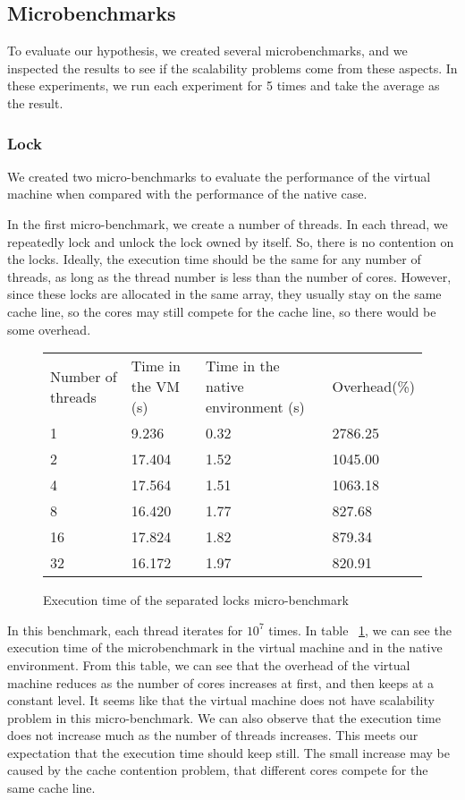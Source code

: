 \subsection{Microbenchmarks}
\label{sec:mic}
To evaluate our hypothesis, we created several microbenchmarks, and we inspected
the results to see if the scalability problems come from these aspects.
In these experiments, we run each experiment for 5 times and take the average
as the result.

\subsubsection{Lock}
We created two micro-benchmarks to evaluate the performance of the virtual
machine when compared with the performance of the native case.

In the first micro-benchmark, we create a number of threads. In each thread, 
we repeatedly lock and unlock the lock owned by itself. So, there is no 
contention on the locks. Ideally, the execution time should be the same for any 
number of threads, as long as the thread number is less than the number of 
cores.  However, since these locks are allocated in the same array, they usually
stay on the same cache line, so the cores may still compete for the cache line,
so there would be some overhead.

\begin{figure}[here]
\begin{tabular}{  l | l | l | l  }
	Number of threads & Time in the VM (s) & Time in the native environment (s) & Overhead(\%) \\
	1 & 9.236 & 0.32 & 2786.25 \\ 
	2 & 17.404 & 1.52 & 1045.00 \\
	4 & 17.564 & 1.51 & 1063.18 \\
	8 & 16.420 & 1.77 & 827.68 \\
	16 & 17.824 & 1.82 & 879.34 \\
	32 & 16.172 & 1.97 & 820.91 \\
\end{tabular}
\caption{Execution time of the separated locks micro-benchmark}
\label{fig:sep_mutex}
\end{figure}

In this benchmark, each thread iterates for $10^7$ times.
In table ~\ref{fig:sep_mutex}, we can see the execution time of the
microbenchmark in the virtual machine and in the native environment.
From this table, we can see that the overhead of the virtual machine reduces as
the number of cores increases at first, and then keeps at a constant level.
It seems like that the virtual machine does not have scalability problem in
this micro-benchmark.
We can also observe that the execution time does not increase much as the
number of threads increases. This meets our expectation that the execution
time should keep still. The small increase may be caused by the cache
contention problem, that different cores compete for the same cache line.


